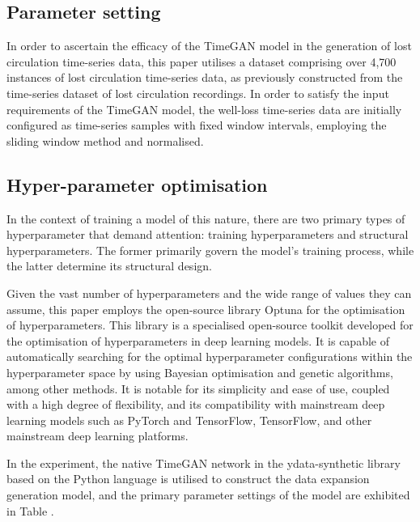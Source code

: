 \documentclass[journal,article,submit,pdftex,moreauthors]{Definitions/mdpi}
\begin{document}
\subsection{Parameter setting }

In order to ascertain the efficacy of the TimeGAN model in the generation of lost circulation time-series data, this paper utilises a dataset comprising over 4,700 instances of lost circulation time-series data, as previously constructed from the time-series dataset of lost circulation recordings. In order to satisfy the input requirements of the TimeGAN model, the well-loss time-series data are initially configured as time-series samples with fixed window intervals, employing the sliding window method and normalised.

\subsection{Hyper-parameter optimisation}

In the context of training a model of this nature, there are two primary types of hyperparameter that demand attention: training hyperparameters and structural hyperparameters. The former primarily govern the model's training process, while the latter determine its structural design. 

Given the vast number of hyperparameters and the wide range of values they can assume, this paper employs the open-source library Optuna for the optimisation of hyperparameters. This library is a specialised open-source toolkit developed for the optimisation of hyperparameters in deep learning models. It is capable of automatically searching for the optimal hyperparameter configurations within the hyperparameter space by using Bayesian optimisation and genetic algorithms, among other methods. It is notable for its simplicity and ease of use, coupled with a high degree of flexibility, and its compatibility with mainstream deep learning models such as PyTorch and TensorFlow, TensorFlow, and other mainstream deep learning platforms.

In the experiment, the native TimeGAN network in the ydata-synthetic library based on the Python language is utilised to construct the data expansion generation model, and the primary parameter settings of the model are exhibited in Table \label{TimeGAN parameter settings}.
\end{document}
